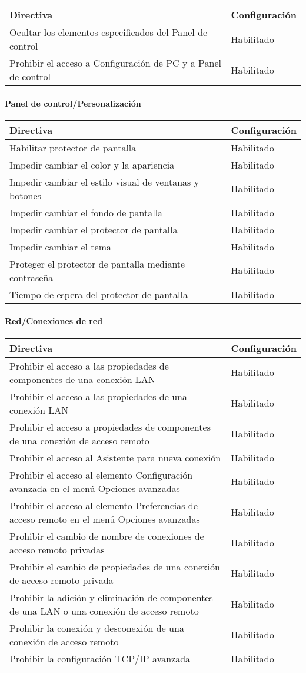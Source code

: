 \documentclass[
]{article}
\begin{document}
\begin{longtable}[]{@{}ll@{}}
\toprule
\textbf{Directiva} & \textbf{Configuración}\tabularnewline
\midrule
\endhead
Ocultar los elementos especificados del Panel de control &
Habilitado\tabularnewline
Prohibir el acceso a Configuración de PC y a Panel de control &
Habilitado\tabularnewline
\bottomrule
\end{longtable}

\hypertarget{panel-de-controlpersonalizaciuxf3n-1}{%
\paragraph{Panel de
control/Personalización}\label{panel-de-controlpersonalizaciuxf3n-1}}

\begin{longtable}[]{@{}ll@{}}
\toprule
\textbf{Directiva} & \textbf{Configuración}\tabularnewline
\midrule
\endhead
Habilitar protector de pantalla & Habilitado\tabularnewline
Impedir cambiar el color y la apariencia & Habilitado\tabularnewline
Impedir cambiar el estilo visual de ventanas y botones &
Habilitado\tabularnewline
Impedir cambiar el fondo de pantalla & Habilitado\tabularnewline
Impedir cambiar el protector de pantalla & Habilitado\tabularnewline
Impedir cambiar el tema & Habilitado\tabularnewline
Proteger el protector de pantalla mediante contraseña &
Habilitado\tabularnewline
Tiempo de espera del protector de pantalla & Habilitado\tabularnewline
\bottomrule
\end{longtable}

\hypertarget{redconexiones-de-red-1}{%
\paragraph{Red/Conexiones de red}\label{redconexiones-de-red-1}}

\begin{longtable}[]{@{}ll@{}}
\toprule
\textbf{Directiva} & \textbf{Configuración}\tabularnewline
\midrule
\endhead
Prohibir el acceso a las propiedades de componentes de una conexión LAN
& Habilitado\tabularnewline
Prohibir el acceso a las propiedades de una conexión LAN &
Habilitado\tabularnewline
Prohibir el acceso a propiedades de componentes de una conexión de
acceso remoto & Habilitado\tabularnewline
Prohibir el acceso al Asistente para nueva conexión &
Habilitado\tabularnewline
Prohibir el acceso al elemento Configuración avanzada en el menú
Opciones avanzadas & Habilitado\tabularnewline
Prohibir el acceso al elemento Preferencias de acceso remoto en el menú
Opciones avanzadas & Habilitado\tabularnewline
Prohibir el cambio de nombre de conexiones de acceso remoto privadas &
Habilitado\tabularnewline
Prohibir el cambio de propiedades de una conexión de acceso remoto
privada & Habilitado\tabularnewline
Prohibir la adición y eliminación de componentes de una LAN o una
conexión de acceso remoto & Habilitado\tabularnewline
Prohibir la conexión y desconexión de una conexión de acceso remoto &
Habilitado\tabularnewline
Prohibir la configuración TCP/IP avanzada & Habilitado\tabularnewline
\bottomrule
\end{longtable}
\end{document}
